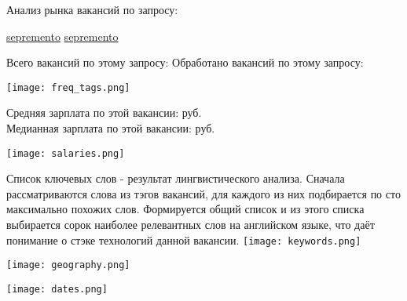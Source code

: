 \documentclass{article}
\newcommand*{\bodyfont}{\sourcesanspro}
\newcommand*{\headerstyle}[1]{\fontsize{16pt}{1em}\headerfont #1}
\newcommand*{\vacancystyle}[1]{{\fontsize{24pt}{1em}\bfseries\headerfont\color{awesome} #1}}
\newcommand*{\parstyle}[1]{\fontsize{9pt}{1em}\bodyfont #1}
\newcommand{\contSep}{\quad\textbar\quad}
\begin{document}
\pagestyle{fancy}
\headerstyle{Анализ рынка вакансий по запросу:}
\vspace{5pt}

\vacancystyle{\capitalisewords{\VacancyName}}

\parstyle{\faGithub\quad \href{https://github.com/sepremento/}{sepremento}
\contSep\faTelegram\quad \href{https://t.me/sepremento}{sepremento}}
\vfill

Всего вакансий по этому запросу: \enskip\TotalVac \contSep Обработано вакансий
по этому запросу:\enskip \ParsedVac
\vspace{20pt}

\texttt{[image: freq\_tags.png]}

\noindent Средняя зарплата по этой вакансии: \enskip\MeanSalary\enskip руб. \\
Медианная зарплата по этой вакансии: \enskip\MedianSalary\enskip руб.
\vfill

\texttt{[image: salaries.png]}

\newpage
Список ключевых слов - результат лингвистического анализа. Сначала
рассматриваются слова из тэгов вакансий, для каждого из них подбирается по сто
максимально похожих слов. Формируется общий список и из этого списка выбирается
сорок наиболее релевантных слов на английском языке, что даёт понимание о стэке
технологий данной вакансии. 
\vfill
\texttt{[image: keywords.png]}

\texttt{[image: geography.png]}
\vfill

\texttt{[image: dates.png]}
\end{document}
